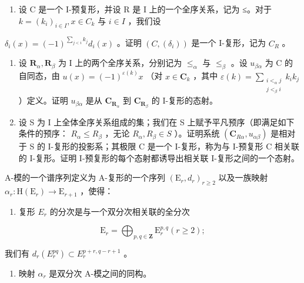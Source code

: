 \begin{enumerate}
\def\labelenumi{\alph{enumi})}
\setcounter{enumi}{1}
\tightlist
\item
  设 C 是一个 I-预复形，并设 R 是 I 上的一个全序关系，记为 ≤。对于 \(k = (k_i)_{i \in I}, x \in C_k\) 与 \(i \in I\) ，我们设
\end{enumerate}

\(\delta_{i}(x) = (-1)^{\sum_{j < i} k_{j}} d_{i}(x)\) 。证明 \((C, (\delta_{i}))\) 是一个 I-复形，记为 \(C_{R}\) 。

\begin{enumerate}
\def\labelenumi{\alph{enumi})}
\setcounter{enumi}{2}
\item
  设 \(\mathbf{R}_{\alpha}, \mathbf{R}_{\beta}\) 为 I 上的两个全序关系，分别记为 \(\leqslant_{\alpha}\) 与 \(\leqslant_{\beta}\) 。设 \(u_{\beta \alpha}\) 为 C 的自同态，由 \(u(x) = (-1)^{\varepsilon(k)} x\) （对 \(x \in \mathbf{C}_k\) ，其中 \(\varepsilon(k) = \sum_{\substack{i < _{\alpha} j \\ j < _{\beta} i}} k_i k_j\) ）定义。证明 \(u_{\beta \alpha}\) 是从 \(\mathbf{C}_{\mathbf{R}_{\alpha}}\) 到 \(\mathbf{C}_{\mathbf{R}_{\beta}}\) 的 I-复形的态射。
\item
  设 S 为 I 上全体全序关系组成的集；我们在 S 上赋予平凡预序（即满足如下条件的预序： \(R_{\alpha} \leqslant R_{\beta}\) ，无论 \(R_{\alpha}, R_{\beta} \in S\) ）。证明系统 \((\mathbf{C}_{R\alpha}, u_{\alpha\beta})\) 是相对于 S 的 I-复形的投影系；其极限 C 是一个 I-复形，称为与 I-预复形 C 相关联的 I-复形。证明 I-预复形的每个态射都诱导出相关联 I-复形之间的一个态射。
\end{enumerate}

A-模的一个谱序列定义为 A-复形的一个序列 \((\mathrm{E}_r, d_r)_{r \geqslant 2}\) 以及一族映射 \(\alpha_r: \mathrm{H}(\mathrm{E}_r) \to \mathrm{E}_{r+1}\) ，使得：

\begin{enumerate}
\def\labelenumi{(\roman{enumi})}
\tightlist
\item
  复形 \(E_r\) 的分次是与一个双分次相关联的全分次
\end{enumerate}

\[
\mathrm{E} _ {r} = \bigoplus_ {p, q \in \mathbf {Z}} \mathrm{E} _ {r} ^ {p, q} (r \geqslant 2);
\]

我们有 \(d_r(E_r^{pq}) \subset E_r^{p + r,q - r + 1}\) 。

\begin{enumerate}
\def\labelenumi{(\roman{enumi})}
\setcounter{enumi}{1}
\tightlist
\item
  映射 \(\alpha_{r}\) 是双分次 A-模之间的同构。
\end{enumerate}

